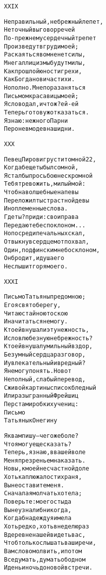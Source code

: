 \begin{minipage}[t]{\dimexpr 0.5\textwidth -\tabcolsep-.5pt}
\begin{alltt}\normalfont\centering
XXIX

Неправильный, небрежный лепет,
Неточный выговор речей
По-прежнему сердечный трепет
Произведут в груди моей;
Раскаяться во мне нет силы,
Мне галлицизмы будут милы,
Как прошлой юности грехи,
Как Богдановича стихи.
Но полно. Мне пора заняться
Письмом красавицы моей;
Я слово дал, и что ж? ей-ей
Теперь готов уж отказаться.
Я знаю: нежного Парни
Перо не в моде в наши дни.
\end{alltt}
\end{minipage}

\begin{minipage}[t]{\dimexpr 0.5\textwidth -\tabcolsep-.5pt}
\begin{alltt}\normalfont\centering
XXX

Певец Пиров и грусти томной 22,
Когда б еще ты был со мной,
Я стал бы просьбою нескромной
Тебя тревожить, милый мой:
Чтоб на волшебные напевы
Переложил ты страстной девы
Иноплеменные слова.
Где ты? приди: свои права
Передаю тебе с поклоном...
Но посреди печальных скал,
Отвыкнув сердцем от похвал,
Один, под финским небосклоном,
Он бродит, и душа его
Не слышит горя моего.
\end{alltt}
\end{minipage}
\clearpage

\begin{minipage}[t]{\dimexpr 0.5\textwidth -\tabcolsep-.5pt}
\begin{alltt}\normalfont\centering
XXXI

Письмо Татьяны предо мною;
Его я свято берегу,
Читаю с тайною тоскою
И начитаться не могу.
Кто ей внушал и эту нежность,
И слов любезную небрежность?
Кто ей внушал умильный вздор,
Безумный сердца разговор,
И увлекательный и вредный?
Я не могу понять. Но вот
Неполный, слабый перевод,
С живой картины список бледный
Или разыгранный Фрейшиц
Перстами робких учениц:
Письмо
Татьяны к Онегину
\end{alltt}
\end{minipage}

\begin{minipage}[t]{\dimexpr 0.5\textwidth -\tabcolsep-.5pt}
\begin{alltt}\normalfont\centering
Я к вам пишу — чего же боле?
Что я могу еще сказать?
Теперь, я знаю, в вашей воле
Меня презреньем наказать.
Но вы, к моей несчастной доле
Хоть каплю жалости храня,
Вы не оставите меня.
Сначала я молчать хотела;
Поверьте: моего стыда
Вы не узнали б никогда,
Когда б надежду я имела
Хоть редко, хоть в неделю раз
В деревне нашей видеть вас,
Чтоб только слышать ваши речи,
Вам слово молвить, и потом
Все думать, думать об одном
И день и ночь до новой встречи.
\end{alltt}
\end{minipage}

